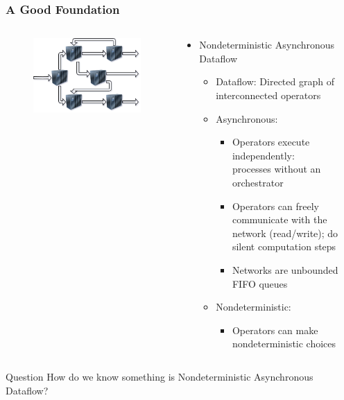 \documentclass[fleqn,aspectratio=169,10pt]{beamer}
\begin{document}
\begin{frame}[fragile]
  \frametitle{A Good Foundation}
  \begin{columns}
    \begin{column}{.35\textwidth}
      \begin{figure}
        \centering
        \includegraphics[width=1\textwidth]{network.png}
      \end{figure}
    \end{column}
    \begin{column}{.65\textwidth}
      \begin{itemize}
        \item Nondeterministic Asynchronous Dataflow
              \begin{itemize}
                \pause
                \item Dataflow: Directed graph of interconnected operators
                \pause
                \item Asynchronous:
                      \begin{itemize}
                        \item Operators execute independently:\\ processes without an orchestrator
                        \item Operators can freely communicate with the network (read/write); do silent computation steps
                        \item Networks are unbounded FIFO queues
                      \end{itemize}
                \pause
                \item Nondeterministic:
                      \begin{itemize}
                        \item Operators can make nondeterministic choices
                      \end{itemize}
              \end{itemize}
      \end{itemize}
    \end{column}
  \end{columns}
  \pause
  \begin{block}{Question}
    How do we know something is Nondeterministic Asynchronous Dataflow?
  \end{block}
\end{frame}
\end{document}
